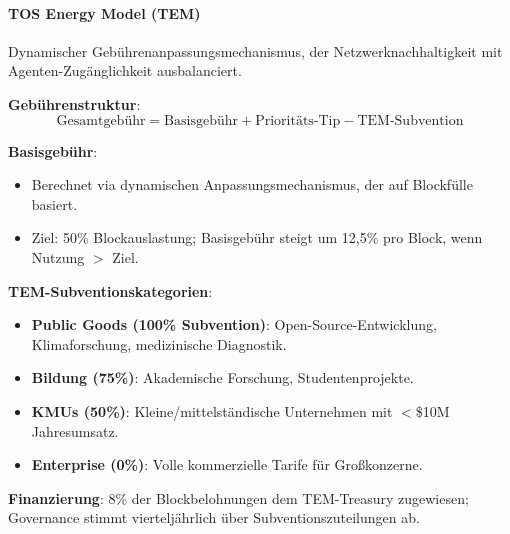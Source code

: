 \documentclass[11pt]{article}
\begin{document}
\paragraph{TOS Energy Model (TEM)}
Dynamischer Gebührenanpassungsmechanismus, der Netzwerknachhaltigkeit mit Agenten-Zugänglichkeit ausbalanciert.

\textbf{Gebührenstruktur}:
\begin{equation}
\text{Gesamtgebühr} = \text{Basisgebühr} + \text{Prioritäts-Tip} - \text{TEM-Subvention}
\end{equation}

\textbf{Basisgebühr}:
\begin{itemize}[noitemsep]
  \item Berechnet via dynamischen Anpassungsmechanismus, der auf Blockfülle basiert.
  \item Ziel: 50\% Blockauslastung; Basisgebühr steigt um 12,5\% pro Block, wenn Nutzung $>$ Ziel.
\end{itemize}

\textbf{TEM-Subventionskategorien}:
\begin{itemize}[noitemsep]
  \item \textbf{Public Goods (100\% Subvention)}: Open-Source-Entwicklung, Klimaforschung, medizinische Diagnostik.
  \item \textbf{Bildung (75\%)}: Akademische Forschung, Studentenprojekte.
  \item \textbf{KMUs (50\%)}: Kleine/mittelständische Unternehmen mit $<$\$10M Jahresumsatz.
  \item \textbf{Enterprise (0\%)}: Volle kommerzielle Tarife für Großkonzerne.
\end{itemize}

\textbf{Finanzierung}: 8\% der Blockbelohnungen dem TEM-Treasury zugewiesen; Governance stimmt vierteljährlich über Subventionszuteilungen ab.
\end{document}
